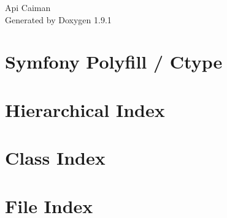\let\mypdfximage\pdfximage\def\pdfximage{\immediate\mypdfximage}\documentclass[twoside]{book}
\newcommand{\+}{\discretionary{\mbox{\scriptsize$\hookleftarrow$}}{}{}}
\newcommand{\clearemptydoublepage}{%
  \newpage{\pagestyle{empty}\cleardoublepage}%
}
\begin{document}
\raggedbottom

\hypersetup{pageanchor=false,
             bookmarksnumbered=true,
             pdfencoding=unicode
            }
\begin{titlepage}
\vspace*{7cm}
\begin{center}%
{\Large Api Caiman }\\
\vspace*{1cm}
{\large Generated by Doxygen 1.9.1}\\
\end{center}
\end{titlepage}
\clearemptydoublepage
{}
\tableofcontents
\clearemptydoublepage
{}
\hypersetup{pageanchor=true}

\chapter{Symfony Polyfill / Ctype}
\label{md_vendor_symfony_polyfill_ctype__r_e_a_d_m_e}

\chapter{Hierarchical Index}

\chapter{Class Index}

\chapter{File Index}

\end{document}
